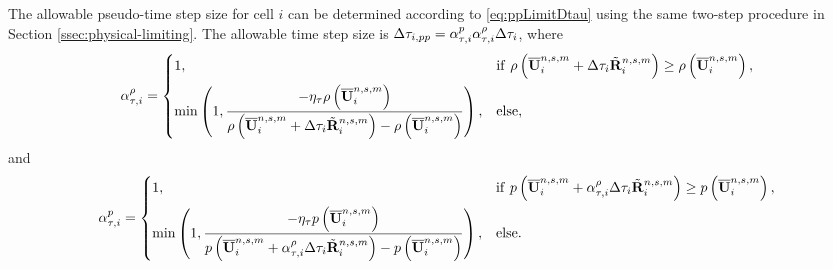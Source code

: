 The allowable pseudo-time step size for cell $i$ can be determined according to \eqref{eq:ppLimitDtau}
using the same two-step procedure in Section \ref{ssec:physical-limiting}.
The allowable time step size is $\mathrm\Delta \tau_{i,pp}= \alpha_{\tau,i}^{p}\alpha_{\tau,i}^{\rho} \mathrm\Delta  \tau_{i}$,
where
\begin{equation}
    \alpha_{\tau,i}^{\rho} = \begin{dcases}
        1,                                                                                                                                                                             & \mathrm{if} \ \rho\left(\overline{\mathbf{U}}^{n,s,m}_i + \mathrm\Delta \tau_{i} \tilde{\mathbf{R}}^{n,s,m}_i\right) \geq  \rho\left(\overline{\mathbf{U}}^{n,s,m}_i\right), \\
        \min\left(1, \dfrac{-\eta_\tau \rho\left(\overline{\mathbf{U}}^{n,s,m}_i\right)}{\rho \left(\overline{\mathbf{U}}^{n,s,m}_i + \mathrm\Delta \tau_{i} \tilde{\mathbf{R}}^{n,s,m}_i\right)-  \rho\left(\overline{\mathbf{U}}^{n,s,m}_i\right)} \right), &
        \mathrm{else},
    \end{dcases}
\end{equation}
and
\begin{equation}
    \alpha_{\tau,i}^{p} = \begin{dcases}
        1,                                                                                                                                                                                              & \mathrm{if} \ p \left(\overline{\mathbf{U}}^{n,s,m}_i + \alpha_{\tau,i}^{\rho} \mathrm\Delta \tau_{i} \tilde{\mathbf{R}}^{n,s,m}_i\right) \geq  p \left(\overline{\mathbf{U}}^{n,s,m}_i\right), \\
        \min\left(1, \dfrac{-\eta_\tau p \left(\overline{\mathbf{U}}^{n,s,m}_i\right)}{p \left(\overline{\mathbf{U}}^{n,s,m}_i +  \alpha_{\tau,i}^{\rho} \mathrm\Delta \tau_{i} \tilde{\mathbf{R}}^{n,s,m}_i\right)-  p \left(\overline{\mathbf{U}}^{n,s,m}_i\right)} \right), &
        \mathrm{else}.
    \end{dcases}
\end{equation}

